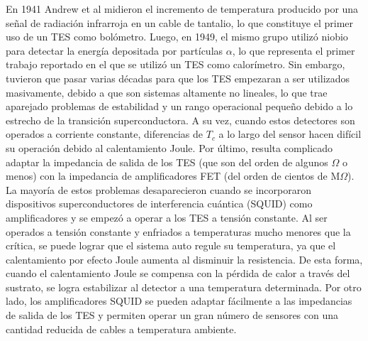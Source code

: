 En 1941 Andrew et al midieron el incremento de temperatura producido por una señal de radiación infrarroja en un cable de tantalio\cite{Andrews1942}, lo que constituye el primer uso de un TES como bolómetro. Luego, en 1949, el mismo grupo utilizó niobio para detectar la energía depositada por partículas $\alpha$, lo que re\-pre\-sen\-ta el primer trabajo reportado en el que se utilizó un TES como calorímetro\cite{Andrews1949}. Sin embargo, tuvieron que pasar varias décadas para que los TES empezaran a ser utilizados masivamente, debido a que son sistemas altamente no lineales, lo que trae aparejado problemas de estabilidad y un rango operacional pequeño debido a lo estrecho de la transición superconductora. A su vez, cuando estos detectores son operados a corriente constante, diferencias de $T_c$ a lo largo del sensor hacen difícil su operación debido al calentamiento Joule. Por último, resulta complicado adaptar la impedancia de salida de los TES (que son del orden de algunos $\Omega$ o menos) con la impedancia de amplificadores FET (del orden de cientos de M$\Omega$)\cite{Irwin2005}. La mayoría de estos problemas desaparecieron cuando se incorporaron dispositivos superconductores de interferencia cuántica (SQUID) como amplificadores y se empezó a operar a los TES a tensión constante\cite{Irwin1995}. Al ser operados a tensión constante y enfriados a temperaturas mucho menores que la crítica, se puede lograr que el sistema auto regule su temperatura\cite{Irwin1995}, ya que el calentamiento por efecto Joule aumenta al disminuir la resistencia. De esta forma, cuando el calentamiento Joule se compensa con la pérdida de calor a través del sustrato, se logra estabilizar al detector a una temperatura determinada. Por otro lado, los amplificadores SQUID se pueden adaptar fácilmente a las impedancias de salida de los TES y permiten operar un gran número de sensores con una cantidad reducida de cables a temperatura ambiente\citep{Irwin2005}.

